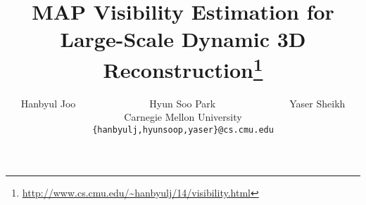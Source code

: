 \documentclass[10pt,twocolumn,letterpaper]{article}
\begin{document}

\title{MAP Visibility Estimation for Large-Scale Dynamic 3D Reconstruction\thanks{
\scriptsize\url{http://www.cs.cmu.edu/\~hanbyulj/14/visibility.html}}}

\author{Hanbyul Joo~~~~~~~~~~~~~~~Hyun Soo Park~~~~~~~~~~~~~~~Yaser Sheikh\\
Carnegie Mellon University\\
{\small \tt \{hanbyulj,hyunsoop,yaser\}@cs.cmu.edu}
}

\maketitle
\end{document}
